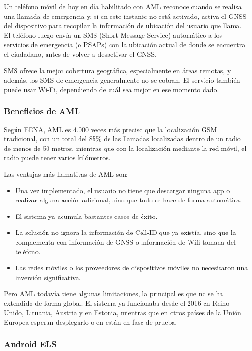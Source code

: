 Un teléfono móvil de hoy en día habilitado con AML reconoce cuando se realiza una llamada de emergencia y, si en este instante no está activado, activa el GNSS del dispositivo para recopilar la información de ubicación del usuario que llama. El teléfono luego envía un SMS (Short Message Service) automático a los servicios de emergencia (o PSAPs) con la ubicación actual de donde se encuentra el ciudadano, antes de volver a desactivar el GNSS.

SMS ofrece la mejor cobertura geográfica, especialmente en áreas remotas, y además, los SMS de emergencia generalmente no se cobran. El servicio también puede usar Wi-Fi, dependiendo de cuál sea mejor en ese momento dado.

\subsubsection{Beneficios de AML}

Según EENA, AML es 4.000 veces más preciso que la localización GSM tradicional, con un total del 85\% de las llamadas localizadas dentro de un radio de menos de 50 metros, mientras que con la localización mediante la red móvil, el radio puede tener varios kilómetros.

Las ventajas más llamativas de AML son:

\begin{itemize}
  \item Una vez implementado, el usuario no tiene que descargar ninguna app o realizar alguna acción adicional, sino que todo se hace de forma automática.
  \item El sistema ya acumula bastantes casos de éxito.
  \item La solución no ignora la información de Cell-ID que ya existía, sino que la complementa con información de GNSS o información de Wifi tomada del teléfono.
  \item Las redes móviles o los proveedores de dispositivos móviles no necesitaron una inversión significativa.
\end{itemize}

Pero AML todavía tiene algunas limitaciones, la principal es que no se ha extendido de forma global. El sistema ya funcionaba desde el 2016 en Reino Unido, Lituania, Austria y en Estonia, mientras que en otros países de la Unión Europea esperan desplegarlo o en están en fase de prueba.

\subsubsection{Android ELS}

